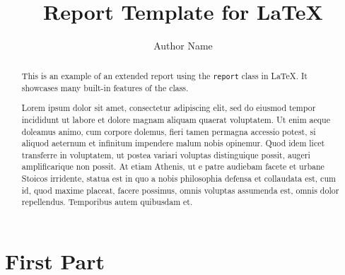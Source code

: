 \documentclass{report}
\title{Report Template for \LaTeX}
\author{Author Name}
\begin{document}
\maketitle

\begin{abstract}
  This is an example of an extended report using the \texttt{report} class in LaTeX. It showcases many built-in features of the class.
\end{abstract}

\tableofcontents

\begin{abstract}
  Lorem ipsum dolor sit amet, consectetur adipiscing elit, sed do eiusmod tempor
  incididunt ut labore et dolore magnam aliquam quaerat voluptatem. Ut enim
  aeque doleamus animo, cum corpore dolemus, fieri tamen permagna accessio
  potest, si aliquod aeternum et infinitum impendere malum nobis opinemur.
  Quod idem licet transferre in voluptatem, ut postea variari voluptas distinguique
  possit, augeri amplificarique non possit. At etiam Athenis, ut e patre audiebam
  facete et urbane Stoicos irridente, statua est in quo a nobis philosophia defensa
  et collaudata est, cum id, quod maxime placeat, facere possimus, omnis voluptas
  assumenda est, omnis dolor repellendus. Temporibus autem quibusdam et.
\end{abstract}

\layout%

\part{First Part}


\end{document}
